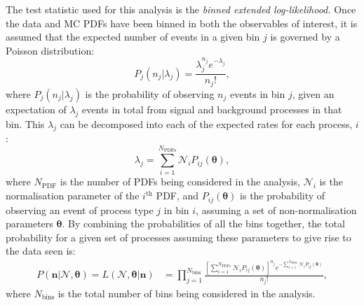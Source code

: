 The test statistic used for this analysis is the \textit{binned extended log-likelihood.} Once the data and MC PDFs have been binned in both the observables of interest, it is assumed that the expected number of events in a given bin $j$ is governed by a Poisson distribution:
\begin{equation}
    P_{j}\left(n_{j} | \lambda_{j}\right) = \frac{\lambda_{j}^{n_{j}}e^{-\lambda_{j}}}{n_{j}!},
\end{equation}
where $P_{j}\left(n_{j} | \lambda_{j}\right)$ is the probability of observing $n_{j}$ events in bin $j$, given an expectation of $\lambda_{j}$ events in total from signal and background processes in that bin. This $\lambda_{j}$ can be decomposed into each of the expected rates for each process, $i$:
\begin{equation}
    \lambda_{j} = \sum_{i=1}^{N_{\textrm{PDFs}}} \mathcal{N}_{i}P_{ij}\left(\bm{\theta}\right),
\end{equation}
where $N_{\textrm{PDF}}$ is the number of PDFs being considered in the analysis, $\mathcal{N}_{i}$ is the normalisation parameter of the $i^{\textrm{th}}$ PDF, and $P_{ij}\left(\bm{\theta}\right)$ is the probability of observing an event of process type $j$ in bin $i$, assuming a set of non-normalisation parameters $\bm{\theta}$. By combining the probabilities of all the bins together, %
the total probability for a given set of processes assuming these parameters to give rise to the data seen is:
\begin{align}
    P\left(\bm{n} | \bm{\mathcal{N}}, \bm{\theta}\right) = 
    L\left(\bm{\mathcal{N}}, \bm{\theta} | \bm{n}\right) &= 
    \prod_{j=1}^{N_{\textrm{bins}}} \frac{\left[\sum_{i=1}^{N_{\textrm{PDFs}}} \mathcal{N}_{i}P_{ij}\left(\bm{\theta}\right)\right]^{n_{j}}e^{-\sum_{i=1}^{N_{\textrm{PDFs}}} \mathcal{N}_{i}P_{ij}\left(\bm{\theta}\right)}}{n_{j}!},
\end{align}
where $N_{\mathrm{bins}}$ is the total number of bins being considered in the analysis. 
